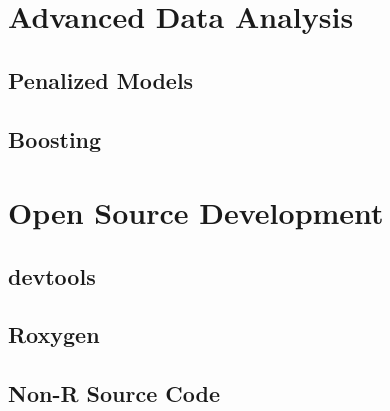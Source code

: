 \documentclass{article}
\begin{document}
\section{Advanced Data Analysis}

\subsection{Penalized Models}

\subsection{Boosting}

\section{Open Source Development}

\subsection{devtools}

\subsection{Roxygen}

\subsection{Non-R Source Code}
\end{document}

